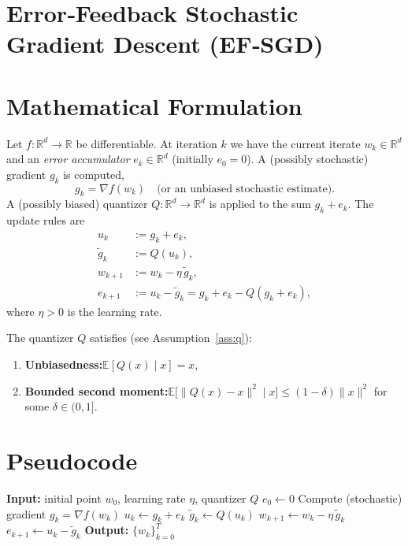 \documentclass{article}
\newcommand{\E}{\mathbb{E}}
\newcommand{\R}{\mathbb{R}}
\begin{document}
\section*{Error‑Feedback Stochastic Gradient Descent (EF‑SGD)}

\section*{Mathematical Formulation}
Let $f:\R^{d}\to\R$ be differentiable.  
At iteration $k$ we have the current iterate $w_{k}\in\R^{d}$ and an \emph{error accumulator}
$e_{k}\in\R^{d}$ (initially $e_{0}=0$).  
A (possibly stochastic) gradient $g_{k}$ is computed,
\[
g_{k}= \nabla f(w_{k})\quad\text{(or an unbiased stochastic estimate)} .
\]
A (possibly biased) quantizer $Q:\R^{d}\to\R^{d}$ is applied to the sum $g_{k}+e_{k}$.
The update rules are
\[
\boxed{
\begin{aligned}
u_{k}      &:= g_{k}+e_{k},\\[2mm]
\tilde g_{k}&:= Q(u_{k}) ,\\[2mm]
w_{k+1}    &:= w_{k}-\eta\,\tilde g_{k},\\[2mm]
e_{k+1}    &:= u_{k}-\tilde g_{k}= g_{k}+e_{k}-Q(g_{k}+e_{k}),
\end{aligned}}
\tag{EF‑SGD}
\]
where $\eta>0$ is the learning rate.

The quantizer $Q$ satisfies (see Assumption~\ref{ass:q}):

\begin{enumerate}[label=(\alph*)]
\item \textbf{Unbiasedness:}\quad $\E[Q(x)\mid x]=x$,
\item \textbf{Bounded second moment:}\quad $\E\!\big[\|Q(x)-x\|^{2}\mid x\big]\leq (1-\delta)\|x\|^{2}$ for some $\delta\in(0,1]$.
\end{enumerate}

\section*{Pseudocode}
\begin{algorithm}[H]
\caption{EF‑SGD}
\begin{algorithmic}[1]
\STATE \textbf{Input:} initial point $w_{0}$, learning rate $\eta$, quantizer $Q$
\STATE $e_{0}\gets 0$
    \STATE Compute (stochastic) gradient $g_{k}= \nabla f(w_{k})$
    \STATE $u_{k}\gets g_{k}+e_{k}$
    \STATE $\tilde g_{k}\gets Q(u_{k})$ \hfill{}
    \STATE $w_{k+1}\gets w_{k}-\eta\,\tilde g_{k}$
    \STATE $e_{k+1}\gets u_{k}-\tilde g_{k}$ \hfill{}
\ENDFOR
\STATE \textbf{Output:} $\{w_{k}\}_{k=0}^{T}$
\end{algorithmic}
\end{algorithm}
\end{document}

